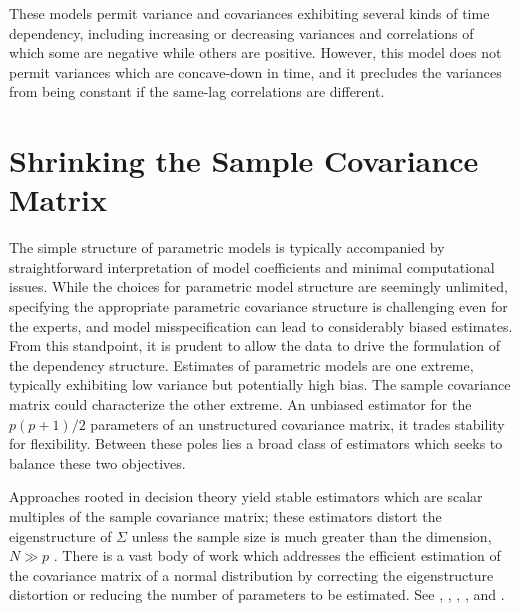 These models permit variance and covariances exhibiting several kinds of time dependency, including increasing or decreasing variances and correlations of which some are negative while others are positive. However, this model does not permit variances which are concave-down in time, and it precludes the variances from being constant if the same-lag correlations are different.
%
%



\section{Shrinking the Sample Covariance Matrix} \label{chapter-1-shrinking-the-sample-cov}

The simple structure of parametric models is typically accompanied by straightforward interpretation of model coefficients and minimal computational issues. While the choices for parametric model structure are seemingly unlimited, specifying the appropriate parametric covariance structure is challenging even for the experts, and model misspecification can lead to considerably biased estimates. From this standpoint, it is prudent to allow the data to drive the formulation of the dependency structure. Estimates of parametric models are one extreme, typically exhibiting low variance but potentially high bias. The sample covariance matrix could characterize the other extreme. An unbiased estimator for the $p\left(p+1\right)/2$ parameters of an unstructured covariance matrix, it trades stability for flexibility. Between these poles lies a broad class of estimators which seeks to balance these two objectives.

\bigskip

Approaches rooted in decision theory yield stable estimators which are scalar multiples of the sample covariance matrix; these estimators distort the eigenstructure of $\Sigma$ unless the sample size is much greater than the dimension, $N \gg p$ \citep{dempster1972covariance}.  There is a vast body of work which addresses the efficient estimation of the covariance matrix of a normal distribution by correcting the eigenstructure distortion or reducing the number of parameters to be estimated. See \cite{stein1975estimation}, \cite{lin1985monte}, \cite{yang1994estimation}, \cite{daniels1999nonconjugate}, and \cite{champion2003empirical}. 

